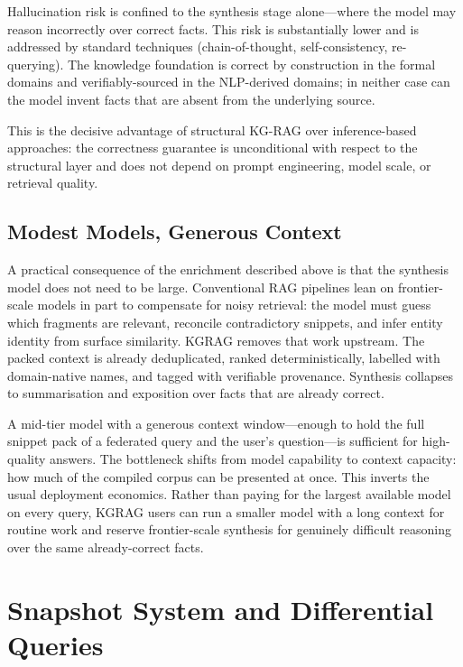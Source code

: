 \documentclass[10pt]{article}
\begin{document}
Hallucination risk is confined to the synthesis stage alone---where the model
may reason incorrectly over correct facts. This risk is substantially lower and
is addressed by standard techniques (chain-of-thought, self-consistency,
re-querying). The knowledge foundation is correct by construction in the
formal domains and verifiably-sourced in the NLP-derived domains; in neither
case can the model invent facts that are absent from the underlying source.

This is the decisive advantage of structural KG-RAG over inference-based
approaches: the correctness guarantee is unconditional with respect to the
structural layer and does not depend on prompt engineering, model scale, or
retrieval quality.

\subsection{Modest Models, Generous Context}

A practical consequence of the enrichment described above is that the
synthesis model does not need to be large. Conventional RAG pipelines lean on
frontier-scale models in part to compensate for noisy retrieval: the model
must guess which fragments are relevant, reconcile contradictory snippets,
and infer entity identity from surface similarity. KGRAG removes that work
upstream. The packed context is already deduplicated, ranked deterministically,
labelled with domain-native names, and tagged with verifiable provenance.
Synthesis collapses to summarisation and exposition over facts that are
already correct.

A mid-tier model with a generous context window---enough to hold the full
snippet pack of a federated query and the user's question---is sufficient
for high-quality answers. The bottleneck shifts from model capability to
context capacity: how much of the compiled corpus can be presented at once.
This inverts the usual deployment economics. Rather than paying for the
largest available model on every query, KGRAG users can run a smaller model
with a long context for routine work and reserve frontier-scale synthesis
for genuinely difficult reasoning over the same already-correct facts.

\section{Snapshot System and Differential Queries}
\end{document}
